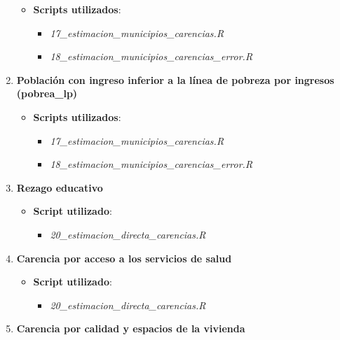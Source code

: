 \documentclass[
  12pt,
]{book}
\providecommand{\tightlist}{%
  \setlength{\itemsep}{0pt}\setlength{\parskip}{0pt}}
\begin{document}
\begin{enumerate}
  \begin{itemize}
  \tightlist
  \item
    \textbf{Scripts utilizados}:

    \begin{itemize}
    \tightlist
    \item
      \emph{17\_estimacion\_municipios\_carencias.R}
    \item
      \emph{18\_estimacion\_municipios\_carencias\_error.R}
    \end{itemize}
  \end{itemize}
\item
  \textbf{Población con ingreso inferior a la línea de pobreza por ingresos (pobrea\_lp)}

  \begin{itemize}
  \tightlist
  \item
    \textbf{Scripts utilizados}:

    \begin{itemize}
    \tightlist
    \item
      \emph{17\_estimacion\_municipios\_carencias.R}
    \item
      \emph{18\_estimacion\_municipios\_carencias\_error.R}
    \end{itemize}
  \end{itemize}
\item
  \textbf{Rezago educativo}

  \begin{itemize}
  \tightlist
  \item
    \textbf{Script utilizado}:

    \begin{itemize}
    \tightlist
    \item
      \emph{20\_estimacion\_directa\_carencias.R}
    \end{itemize}
  \end{itemize}
\item
  \textbf{Carencia por acceso a los servicios de salud}

  \begin{itemize}
  \tightlist
  \item
    \textbf{Script utilizado}:

    \begin{itemize}
    \tightlist
    \item
      \emph{20\_estimacion\_directa\_carencias.R}
    \end{itemize}
  \end{itemize}
\item
  \textbf{Carencia por calidad y espacios de la vivienda}


\end{enumerate}
\end{document}
